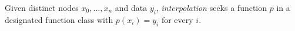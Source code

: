 
Given distinct nodes $x_0,\ldots,x_n$ and data $y_i$, \emph{interpolation} seeks a function $p$ in a designated function class with $p(x_i)=y_i$ for every $i$.
